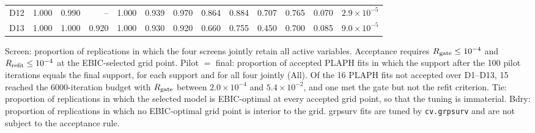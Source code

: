 \begin{table}[!htbp]
\begin{threeparttable}
\begin{tabular}{lrrrrrrrrrrrr}
D12 & 1.000 & 0.990 & -- & 1.000 & 0.939 & 0.970 & 0.864 & 0.884 & 0.707 & 0.765 & 0.070 & $2.9\times10^{-5}$ \\
D13 & 1.000 & 1.000 & 0.920 & 1.000 & 0.930 & 0.920 & 0.660 & 0.755 & 0.450 & 0.700 & 0.085 & $9.0\times10^{-5}$ \\
\bottomrule
\end{tabular}
\begin{tablenotes}[flushleft]
\footnotesize
\item Screen: proportion of replications in which the four screens jointly retain all active variables. Acceptance requires $R_{\rm gate}\le10^{-4}$ and $R_{\rm refit}\le10^{-4}$ at the EBIC-selected grid point. Pilot $=$ final: proportion of accepted PLAPH fits in which the support after the 100 pilot iterations equals the final support, for each support and for all four jointly (All). Of the 16 PLAPH fits not accepted over D1--D13, 15 reached the 6000-iteration budget with $R_{\rm gate}$ between $2.0\times10^{-4}$ and $5.4\times10^{-2}$, and one met the gate but not the refit criterion. Tie: proportion of replications in which the selected model is EBIC-optimal at every accepted grid point, so that the tuning is immaterial. Bdry: proportion of replications in which no EBIC-optimal grid point is interior to the grid. grpsurv fits are tuned by \texttt{cv.grpsurv} and are not subject to the acceptance rule.
\end{tablenotes}
\end{threeparttable}
\end{table}

